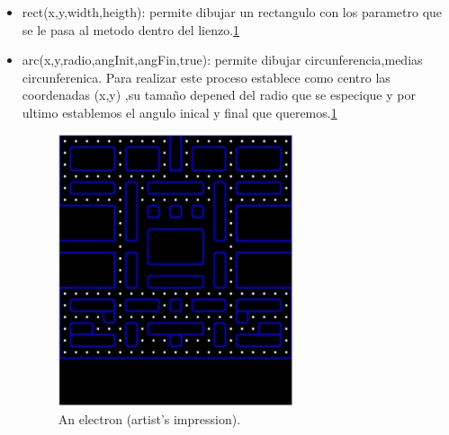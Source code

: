 \begin{enumerate}
\begin{itemize}
\begin{figure}[h]
\begin{center}
\end{center}
\end{figure} 
\item rect(x,y,width,heigth): permite dibujar un rectangulo con los parametro que se le pasa al metodo dentro del lienzo.\ref{fig:canvasCirc}
\item arc(x,y,radio,angInit,angFin,true): permite dibujar circunferencia,medias circunferenica. Para realizar este proceso establece como centro las coordenadas (x,y) ,su tamaño depened del radio que se especique y por ultimo establemos el angulo inical y final que queremos.\ref{fig:canvasCirc}  \begin{figure}[h]
\begin{center}
   \includegraphics[width=0.5\linewidth, height=8cm]{Figures/canvasCirc}
	\decoRule
	\caption[An Electron]{An electron (artist's impression).}
\label{fig:canvasCirc}
\end{center}
\end{figure}  
\end{itemize}
\end{enumerate}
